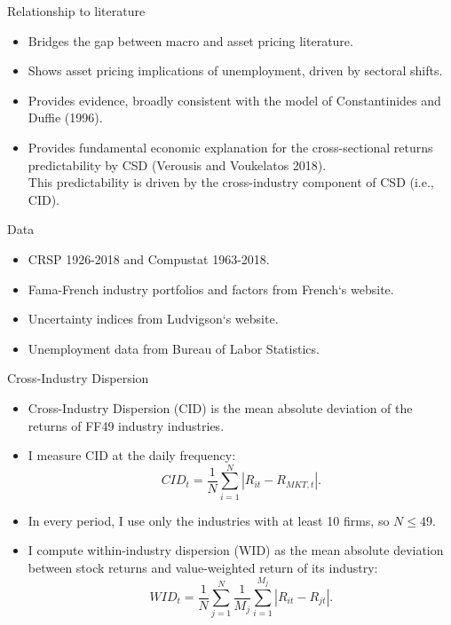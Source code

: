 \documentclass{beamer}
\begin{document}
\begin{frame}{Relationship to literature}
\begin{itemize}
    \item {Bridges the gap between macro and asset pricing literature.}
    \item {Shows asset pricing implications of unemployment, driven by sectoral shifts.}
    \item {Provides evidence, broadly consistent with the model of Constantinides and Duffie (1996).}
    \item {Provides fundamental economic explanation for the cross-sectional returns predictability by CSD (Verousis and Voukelatos 2018).\\
    This predictability is driven by the cross-industry component of CSD (i.e., CID).}
\end{itemize}
\end{frame}



\begin{frame}{Data}
\begin{itemize}
    \item {CRSP 1926-2018 and Compustat 1963-2018.}
    \item {Fama-French industry portfolios and factors from French`s website.}
    \item {Uncertainty indices from Ludvigson`s website.}
    \item {Unemployment data from Bureau of Labor Statistics.}
\end{itemize}
\end{frame}



\begin{frame}{Cross-Industry Dispersion}
\begin{itemize}
    \item {Cross-Industry Dispersion (CID) is the mean absolute deviation of the returns of FF49 industry industries.}
    \item {I measure CID at the daily frequency: \\
    $$CID_t = \frac{1}{N}\sum^{N}_{i=1}{|R_{it}-R_{MKT,t}|}.$$}
    \item {In every period, I use only the industries with at least 10 firms, so $N \leq 49$.}
    \item {I compute within-industry dispersion (WID) as the mean absolute deviation between stock returns and value-weighted return of its industry:
    $$WID_t = \frac{1}{N}\sum^{N}_{j=1}\frac{1}{M_j}\sum^{M_j}_{i=1}{|R_{it}-R_{jt}|}.$$}
\end{itemize}
\end{frame}
\end{document}
